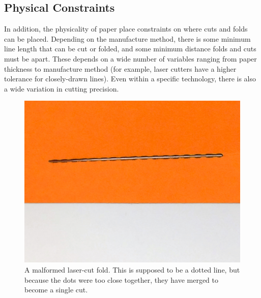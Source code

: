 \subsection{Physical Constraints}\label{physical-constraints}

In addition, the physicality of paper place constraints on where cuts
and folds can be placed. Depending on the manufacture method, there is
some minimum line length that can be cut or folded, and some minimum
distance folds and cuts must be apart. These depends on a wide number of
variables ranging from paper thickness to manufacture method (for
example, laser cutters have a higher tolerance for closely-drawn lines).
Even within a specific technology, there is also a wide variation in
cutting precision.

\begin{figure}[htbp]
\centering
\includegraphics{figures/45_Tech_Constraints/tooclosecuts.jpg}
\caption{A malformed laser-cut fold. This is supposed to be a dotted
line, but because the dots were too close together, they have merged to
become a single cut.}
\end{figure}

